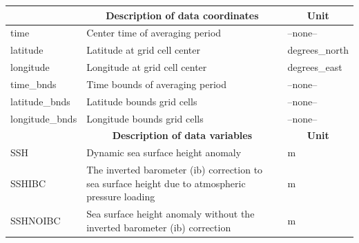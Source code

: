 \begin{longtable}{|m{}|m{}|m{}|}
\hline \endhead \hline \endfoot
\rowcolor{lightgray} \multicolumn{1}{|c|}{\textbf{Coordinates}} & \multicolumn{1}{|c|}{\textbf{Description of data coordinates}} &  \multicolumn{1}{|c|}{\textbf{Unit}}\\ \hline
time &Center time of averaging period &--none--  \\ \hline
latitude &Latitude at grid cell center &degrees\_north  \\ \hline
longitude &Longitude at grid cell center &degrees\_east  \\ \hline
time\_bnds &Time bounds of averaging period &--none--  \\ \hline
latitude\_bnds &Latitude bounds grid cells &--none--  \\ \hline
longitude\_bnds &Longitude bounds grid cells &--none--  \\ \hline
\rowcolor{lightgray} \multicolumn{1}{|c|}{\textbf{Variables}} & \multicolumn{1}{|c|}{\textbf{Description of data variables}} &  \multicolumn{1}{|c|}{\textbf{Unit}}\\ \hline
SSH &Dynamic sea surface height anomaly &m  \\ \hline
SSHIBC &The inverted barometer (ib) correction to sea surface height due to atmospheric pressure loading &m  \\ \hline
SSHNOIBC &Sea surface height anomaly without the inverted barometer (ib) correction &m  \\ \hline
\end{longtable}

\newp
\pagebreak
